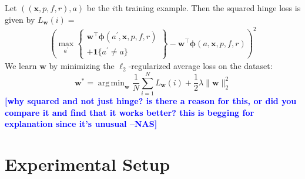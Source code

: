 \documentclass[11pt,a4paper]{article}
\newcommand{\indicator}[1]{I_{\{#1\}}} %
\DeclareMathOperator*{\argmax}{arg\,max}
\DeclareMathOperator*{\argmin}{arg\,min}
\newcommand{\ensuretext}[1]{#1}
\newcommand{\nssmarker}{\ensuretext{\textcolor{magenta}{\ensuremath{^{\textsc{NS}}_{\textsc{S}}}}}}
\newcommand{\stmarker}{\ensuretext{\textcolor{blue}{\ensuremath{^{\textsc{S}}_{\textsc{T}}}}}}
\newcommand{\arkcomment}[3]{\ensuretext{\textcolor{#3}{[#1 #2]}}}
\newcommand{\nss}[1]{\arkcomment{\nssmarker}{#1}{magenta}}
\newcommand{\st}[1]{\arkcomment{\stmarker}{#1}{blue}}
\newcommand{\nascomment}[1]{\textcolor{blue}{\textbf{\small [#1 --NAS]}}}
\begin{document}
% 

Let $((\mathbf{x}, p, f, r), a)$ %
be the $i$th training example.
Then the squared hinge loss is given by $L_{\mathbf{w}}(i) =$
\begin{align*}
\left(\max_{a^\prime} \left\{ \begin{array}{c} \mathbf{w}^\top \mathbf{\phi}(a^\prime, \mathbf{x}, p, f,
r) \\ + \boldsymbol{1}\{a^\prime \not = a\} \end{array}\right \} - 
  \mathbf{w}^\top \mathbf{\phi}(a, \mathbf{x}, p, f, r)\right)^2
\end{align*}
We learn $\mathbf{w}$ by minimizing the $\ell_2$-regularized average loss on the dataset:
\begin{equation}
\mathbf{w^*} = \argmin_\mathbf{w}{
    \frac{1}{N}\sum_{i = 1}^N L_{\mathbf{w}}(i) + \frac{1}{2} \lambda \| \mathbf{w} \|_2^2
}
\end{equation}
\nascomment{why squared and not just hinge?  is there a reason for
  this, or did you compare it and find that it works better?  this is
  begging for explanation since it's unusual}

\section{Experimental Setup}
\end{document}
